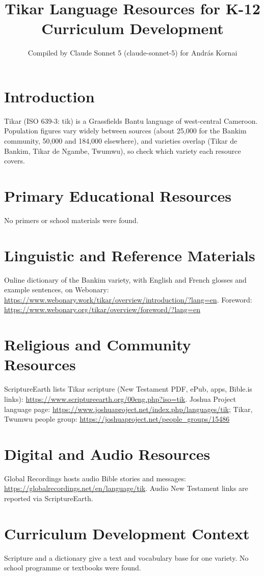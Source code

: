 \documentclass[12pt]{article}
\title{Tikar Language Resources for K-12 Curriculum Development}
\author{Compiled by Claude Sonnet 5 (claude-sonnet-5) for Andr\'as Kornai}
\date{}
\begin{document}
\maketitle

\section{Introduction}
Tikar (ISO 639-3: tik) is a Grassfields Bantu language of west-central Cameroon. Population figures vary widely between sources (about 25,000 for the Bankim community, 50,000 and 184,000 elsewhere), and varieties overlap (Tikar de Bankim, Tikar de Ngambe, Twumwu), so check which variety each resource covers.

\section{Primary Educational Resources}
No primers or school materials were found.

\section{Linguistic and Reference Materials}
Online dictionary of the Bankim variety, with English and French glosses and example sentences, on Webonary: \url{https://www.webonary.work/tikar/overview/introduction/?lang=en}. Foreword: \url{https://www.webonary.org/tikar/overview/foreword/?lang=en}

\section{Religious and Community Resources}
ScriptureEarth lists Tikar scripture (New Testament PDF, ePub, apps, Bible.is links): \url{https://www.scriptureearth.org/00eng.php?iso=tik}. Joshua Project language page: \url{https://www.joshuaproject.net/index.php/languages/tik}; Tikar, Twumwu people group: \url{https://joshuaproject.net/people_groups/15486}

\section{Digital and Audio Resources}
Global Recordings hosts audio Bible stories and messages: \url{https://globalrecordings.net/en/language/tik}. Audio New Testament links are reported via ScriptureEarth.

\section{Curriculum Development Context}
Scripture and a dictionary give a text and vocabulary base for one variety. No school programme or textbooks were found.
\end{document}

